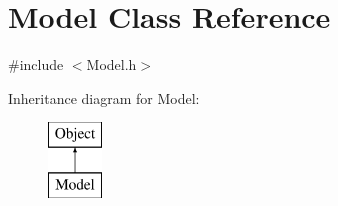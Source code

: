 \hypertarget{class_model}{}\section{Model Class Reference}
\label{class_model}


{\ttfamily \#include $<$Model.\+h$>$}

Inheritance diagram for Model\+:\begin{figure}[H]
\begin{center}
\leavevmode
\includegraphics[height=2.000000cm]{class_model}
\end{center}
\end{figure}

